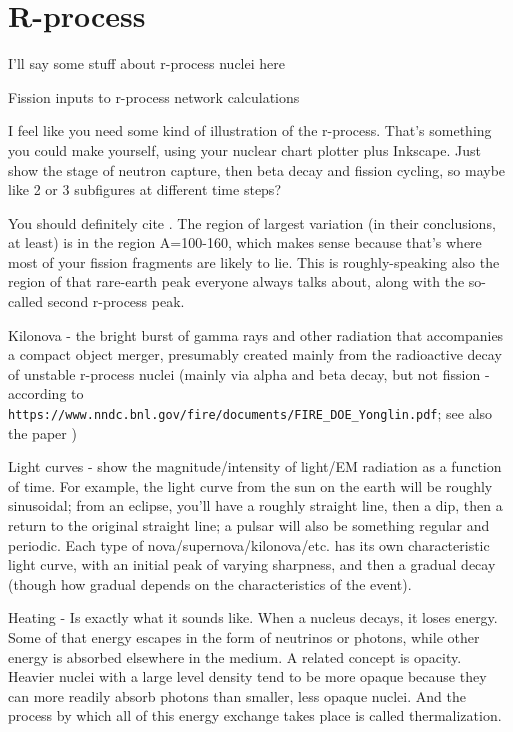 \chapter{R-process}\label{chap:rprocess}

I'll say some stuff about r-process nuclei here

Fission inputs to r-process network calculations

I feel like you need some kind of illustration of the r-process. That's something you could make yourself, using your nuclear chart plotter plus Inkscape. Just show the stage of neutron capture, then beta decay and fission cycling, so maybe like 2 or 3 subfigures at different time steps?

You should definitely cite \cite{Eichler2015}. The region of largest variation (in their conclusions, at least) is in the region A=100-160, which makes sense because that's where most of your fission fragments are likely to lie. This is roughly-speaking also the region of that rare-earth peak everyone always talks about, along with the so-called second r-process peak.

Kilonova - the bright burst of gamma rays and other radiation that accompanies a compact object merger, presumably created mainly from the radioactive decay of unstable r-process nuclei (mainly via alpha and beta decay, but not fission - according to \verb|https://www.nndc.bnl.gov/fire/documents/FIRE_DOE_Yonglin.pdf|; see also the paper \cite{Zhu2018})

Light curves - show the magnitude/intensity of light/EM radiation as a function of time. For example, the light curve from the sun on the earth will be roughly sinusoidal; from an eclipse, you'll have a roughly straight line, then a dip, then a return to the original straight line; a pulsar will also be something regular and periodic. Each type of nova/supernova/kilonova/etc. has its own characteristic light curve, with an initial peak of varying sharpness, and then a gradual decay (though how gradual depends on the characteristics of the event).

Heating - Is exactly what it sounds like. When a nucleus decays, it loses energy. Some of that energy escapes in the form of neutrinos or photons, while other energy is absorbed elsewhere in the medium. A related concept is opacity. Heavier nuclei with a large level density tend to be more opaque because they can more readily absorb photons than smaller, less opaque nuclei. And the process by which all of this energy exchange takes place is called thermalization.

